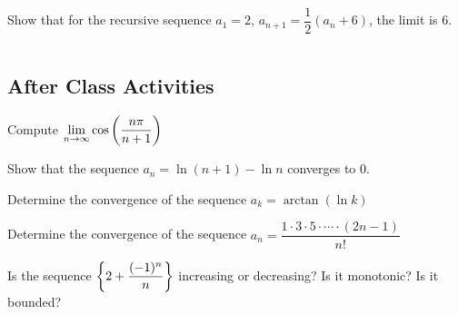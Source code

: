 \documentclass[notes]{subfiles}
\begin{document}
		\begin{ex}
			Show that for the recursive sequence $a_1 = 2$, $a_{n+1} = \dfrac{1}{2}(a_n + 6)$, the limit is 6.
		\end{ex}
			 $ $
			\newsec
	\subsection*{After Class Activities}
		\begin{ex}
			Compute $\displaystyle \lim_{n\to\infty} \cos \left( \dfrac{n\pi}{n+1}\right)$
		\end{ex}
			
		\begin{ex}
			Show that the sequence $a_n = \ln (n+1) - \ln n$ converges to 0.
		\end{ex}
			\newpage
			
		\begin{ex}
			Determine the convergence of the sequence $a_k = \arctan(\ln k)$
		\end{ex}
			
		\begin{ex}
			Determine the convergence of the sequence $a_n = \dfrac{1\cdot 3\cdot 5\cdot \cdots \cdot (2n-1)}{n!}$
		\end{ex}
			
		\begin{ex}
			Is the sequence $\left\lbrace 2 + \dfrac{(-1)^n}{n} \right\rbrace$ increasing or decreasing?  Is it monotonic?  Is it bounded?
		\end{ex}
\clearpage
\end{document}
